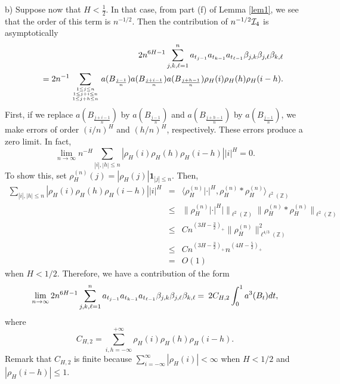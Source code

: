 \documentclass[a4paper]{article}
\numberwithin{equation}{section}
\begin{document}
\begin{en-text}
b) Suppose now that $H<\frac 12$. In that case, from part (f) of Lemma \ref{lem1}, we see that the order of this term is $n^{-1/2}$. 
Then the contribution of $n^{-1/2}{\mathcal I}_4$ is asymptotically 
 \begin{eqnarray*}
 && 2n^{6H-1}   \sum_{j,k,\ell=1}^n  a_{t_{j-1}} a_{t_{k-1}} a_{t_{\ell-1}}\beta_{j,k} \beta_{j,\ell}  \beta_{k,\ell}\\
& &\quad = 2n^{-1}  \sum_{ {1\le j \le n \atop 1\le j+i \le n} \atop {1\le j+h\le n}}   a(B_{\frac{j-1}n})    a(B_{\frac{j+i-1}n}) a(B_{\frac{j+h-1}n}) \rho_H(i) \rho_H(h) \rho_H(i-h).
\end{eqnarray*}
First, if we replace $ a(B_{\frac{j+i-1}n})$ by  $a(B_{\frac{j-1}n})$ and $a(B_{\frac{j+h-1}n})$ by  $a(B_{\frac{j-1}n})$, we make  errors of order $(i/n)^H$ and $(h/n)^H$, respectively. These errors produce a zero limit. In fact,
\[
\lim_{n\rightarrow \infty}  n^{-H}  \sum_{|i|, |h| \le n}   |\rho_H(i) \rho_H(h) \rho_H(i-h)|  |i|^H =0.
\]
To show this, set $\rho^{(n)}_H(j)= |\rho_H(j)| \mathbf{1}_{|j|\le n}$. Then,
\begin{eqnarray*}
 \sum_{|i|, |h| \le n}   |\rho_H(i) \rho_H(h) \rho_H(i-h)|  |i|^H &=& \langle  \rho^{(n)}_H |\cdot|^H, \rho_H^{(n)} *\rho_H^{(n)} \rangle_{\ell^2(\mathbb{Z})} \\
 &\le & \| \rho^{(n)}_H |\cdot|^H| \|_{\ell^2(\mathbb{Z})} \| \rho_H^{(n)} *\rho_H^{(n)} \|_{\ell^2(\mathbb{Z})} \\
 &\le & C n^{(3H -\frac 32)_+}  \|\rho_H^{(n)} \| ^2_{\ell^{4/3}(\mathbb{Z})}  \\
 &\le & Cn^{(3H -\frac 32)_+} n^{(4H-\frac 52)_+}
 \\&=& O(1) 
 \end{eqnarray*}
when $H<1/2$. 
Therefore, we have a contribution of the form
 \[
 \lim_{n\rightarrow \infty}  2n^{6H-1}  \sum_{j,k,\ell=1}^n  a_{t_{j-1}} a_{t_{k-1}} a_{t_{\ell-1}} \beta_{j,k} \beta_{j,\ell}  \beta_{k,\ell}
 {\color{black}
 \>=\> 2C_{H,2} \int_0^1 a^3(B_t) dt,
 }
\]
 {\color{black}
where
\[
C_{H,2}=  \sum_{i,h=-\infty}^{+\infty} \rho_H(i) \rho_H(h) \rho_H(i-h).
\]
Remark that $C_{H,2}$ is finite because $\sum_{i=-\infty}^\infty|\rho_H(i)|<\infty$ when $H<1/2$ and 
$|\rho_H(i-h)|\leq1$. 
}  
\end{en-text}       
         
\end{document}
